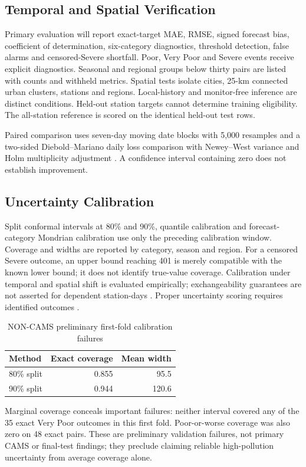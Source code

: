 \subsection{Temporal and Spatial Verification}
Primary evaluation will report exact-target MAE, RMSE, signed forecast bias,
coefficient of determination, six-category diagnostics, threshold detection,
false alarms and censored-Severe shortfall. Poor, Very Poor and Severe events
receive explicit diagnostics. Seasonal and regional groups below thirty pairs
are listed with counts and withheld metrics.
Spatial tests isolate cities, 25-km connected urban clusters, stations and
regions. Local-history and monitor-free inference are distinct conditions.
Held-out station targets cannot determine training eligibility. The all-station
reference is scored on the identical held-out test rows.

Paired comparison uses seven-day moving date blocks with 5,000 resamples and
a two-sided Diebold--Mariano daily loss comparison with Newey--West variance
and Holm multiplicity adjustment \cite{diebold1995comparing}. A confidence
interval containing zero does not establish improvement.

\subsection{Uncertainty Calibration}
Split conformal intervals at 80\% and 90\%, quantile calibration and
forecast-category Mondrian calibration use only the preceding calibration
window. Coverage and widths are reported by category, season and region.
For a censored Severe outcome, an upper bound reaching 401 is merely compatible
with the known lower bound; it does not identify true-value coverage.
Calibration under temporal and spatial shift is evaluated empirically;
exchangeability guarantees are not asserted for dependent station-days
\cite{gibbs2021aci,xu2021enbpi}. Proper uncertainty scoring requires identified
outcomes \cite{gneiting2007scoring}.





\begin{table}[h]\centering\caption{NON-CAMS preliminary first-fold calibration failures}
\begin{tabular}{lrr}\toprule Method & Exact coverage & Mean width\\\midrule
80\% split & 0.855 & 95.5\\
90\% split & 0.944 & 120.6\\
\bottomrule\end{tabular}
\end{table}
Marginal coverage conceals important failures: neither interval covered any
of the 35 exact Very Poor outcomes in this first fold. Poor-or-worse coverage
was also zero on 48 exact pairs. These are preliminary validation failures,
not primary CAMS or final-test findings; they preclude claiming reliable
high-pollution uncertainty from average coverage alone.


